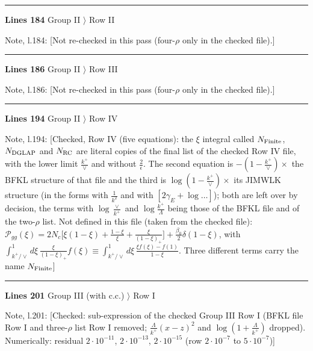 \documentclass[10pt]{article}
\newenvironment{notebox}{\def\FrameCommand{{\color{notebar}\vrule width 1.5pt}\hspace{6pt}}\MakeFramed{\advance\hsize-\width\FrameRestore}\small}{\endMakeFramed}
\begin{document}
\noindent\rule{\linewidth}{0.3pt}\par\noindent\textbf{Lines 184} \quad \textsf{Group II $\rangle$ Row II}\par
\begin{notebox}\textsf{\small Note, l.184:} [Not re-checked in this pass (four-$\rho$ only in the checked file).]\end{notebox}
\noindent\rule{\linewidth}{0.3pt}\par\noindent\textbf{Lines 186} \quad \textsf{Group II $\rangle$ Row III}\par
\begin{notebox}\textsf{\small Note, l.186:} [Not re-checked in this pass (four-$\rho$ only in the checked file).]\end{notebox}
\noindent\rule{\linewidth}{0.3pt}\par\noindent\textbf{Lines 194} \quad \textsf{Group II $\rangle$ Row IV}\par
\begin{notebox}\textsf{\small Note, l.194:} [Checked, Row IV (five equations): the $\xi$ integral called $N_{\rm Finite}$, $N_{\rm DGLAP}$ and $N_{\rm RC}$ are literal copies of the final list of the checked Row IV file, with the lower limit $\frac{k^{+}}{\vee}$ and without $\frac{2}{\epsilon}$. The second equation is $-(1-\frac{k^{+}}{\vee})\times$ the BFKL structure of that file and the third is $\log(1-\frac{k^{+}}{\vee})\times$ its JIMWLK structure (in the forms with $\frac{1}{k^{2}}$ and with $[2\gamma_{E}+\log\dots]$); both are left over by decision, the terms with $\log\frac{\vee}{k^{+}}$ and $\log\frac{k^{+}}{\Lambda}$ being those of the BFKL file and of the two-$\rho$ list. Not defined in this file (taken from the checked file): $\mathcal P_{gg}(\xi)=2N_{c}\big[\xi(1-\xi)+\frac{1-\xi}{\xi}+\frac{\xi}{(1-\xi)_{+}}\big]+\frac{\beta_{0}}{2}\delta(1-\xi)$, with $\int_{k^{+}/\vee}^{1}d\xi\,\frac{\xi}{(1-\xi)_{+}}f(\xi)\equiv\int_{k^{+}/\vee}^{1}d\xi\,\frac{\xi f(\xi)-f(1)}{1-\xi}$. Three different terms carry the name $N_{\rm Finite}$]\end{notebox}
\noindent\rule{\linewidth}{0.3pt}\par\noindent\textbf{Lines 201} \quad \textsf{Group III (with c.c.) $\rangle$ Row I}\par
\begin{notebox}\textsf{\small Note, l.201:} [Checked: sub-expression of the checked Group III Row I (BFKL file Row I and three-$\rho$ list Row I removed; $\frac{\Lambda}{k^{+}}(x-z)^{2}$ and $\log(1+\frac{\Lambda}{k^{+}})$ dropped). Numerically: residual $2\cdot10^{-11}$, $2\cdot10^{-13}$, $2\cdot10^{-15}$ (row $2\cdot10^{-7}$ to $5\cdot10^{-7}$)]\end{notebox}
\end{document}
